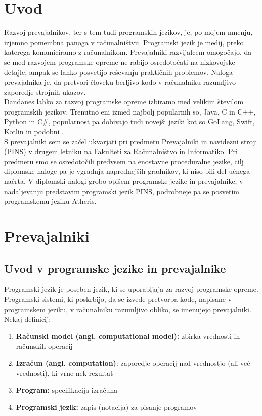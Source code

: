 \documentclass[a4paper, 12p]{book}
\begin{document}
\mainmatter
\setcounter{page}{1}
\pagestyle{fancy}

\chapter{Uvod}

Razvoj prevajalnikov, ter s tem tudi programskih jezikov, je, po mojem mnenju, izjemno pomembna panoga v računalništvu. Programski jezik je medij, preko katerega komuniciramo z računalnikom. Prevajalniki razvijalcem omogočajo, da se med razvojem programske opreme ne rabijo osredotočati na nizkovojske detajle, ampak se lahko posvetijo reševanju praktičnih problemov. Naloga prevajalnika je, da pretvori človeku berljivo kodo v računalniku razumljivo zaporedje strojnih ukazov. \\
\indent Dandanes lahko za razvoj programske opreme izbiramo med velikim številom programskih jezikov. Trenutno eni izmed najbolj popularnih so, Java, C in C++, Python in C\#, popularnost pa dobivajo tudi novejši jeziki kot so GoLang, Swift, Kotlin in podobni \cite{tiobeIndex}. \\
\indent S prevajalniki sem se začel ukvarjati pri predmetu Prevajalniki in navidezni stroji (PINS) v drugem letniku na Fakulteti za Računalništvo in Informatiko. Pri predmetu smo se osredotočili predvsem na enostavne proceduralne jezike, cilj diplomske naloge pa je vgradnja naprednejših gradnikov, ki niso bili del učnega načrta. V diplomski nalogi grobo opišem programske jezike in prevajalnike, v nadaljevanju predstavim programski jezik PINS, podrobneje pa se posvetim programskemu jeziku Atheris.

\chapter{Prevajalniki}
\label{ch0}

\section{Uvod v  programske jezike in prevajalnike}

Programski jezik je poseben jezik, ki se uporabljaja za razvoj programske opreme. Programski sistemi, ki poskrbijo, da se izvede pretvorba kode, napisane v programskem jeziku, v računalniku razumljivo obliko, se imenujejo prevajalniki. \\
Nekaj definicij:
\begin{enumerate}  
	\item \textbf{Računski model (angl. computational model):} zbirka vrednosti in računskih operacij 
	\item \textbf{Izračun (angl. computation)}: zaporedje operacij nad vrednostjo (ali več vrednosti), ki vrne nek rezultat
	\item \textbf{Program:} specifikacija izračuna
	\item \textbf{Programski jezik:} zapis (notacija) za pisanje programov
\end{enumerate}
\end{document}
